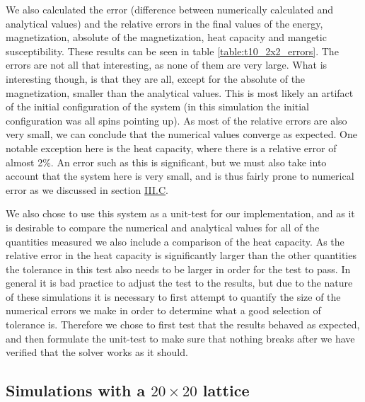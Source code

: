 \documentclass[reprint,english,notitlepage]{revtex4-1}  %
\begin{document}
We also calculated the error (difference between numerically calculated and analytical values) and the relative errors in the final values of the energy, magnetization, absolute of the magnetization, heat capacity and mangetic susceptibility. These results can be seen in table \ref{table:t10_2x2_errors}. The errors are not all that interesting, as none of them are very large. What is interesting though, is that they are all, except for the absolute of the magnetization, smaller than the analytical values. This is most likely an artifact of the initial configuration of the system (in this simulation the initial configuration was all spins pointing up). As most of the relative errors are also very small, we can conclude that the numerical values converge as expected. One notable exception here is the heat capacity, where there is a relative error of almost 2\%. An error such as this is significant, but we must also take into account that the system here is very small, and is thus fairly prone to numerical error as we discussed in section \hyperref[sec:III:C]{III.C}. 

We also chose to use this system as a unit-test for our implementation, and as it is desirable to compare the numerical and analytical values for all of the quantities measured we also include a comparison of the heat capacity. As the relative error in the heat capacity is significantly larger than the other quantities the tolerance in this test also needs to be larger in order for the test to pass. In general it is bad practice to adjust the test to the results, but due to the nature of these simulations it is necessary to first attempt to quantify the size of the numerical errors we make in order to determine what a good selection of tolerance is. Therefore we chose to first 
test that the results behaved as expected, and then formulate the unit-test to make sure that nothing breaks after we have verified that the solver works as it should.

\subsection{Simulations with a $20 \times 20$ lattice} \label{sec:V:C}
\end{document}

